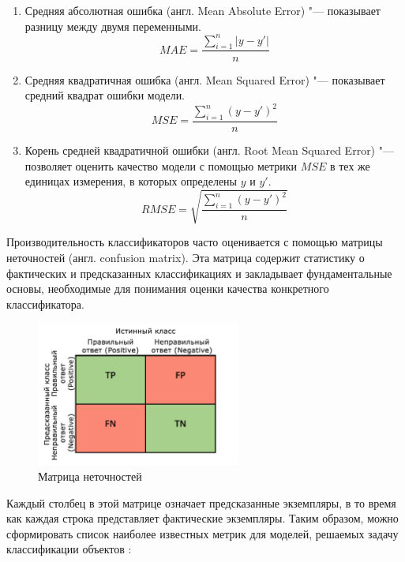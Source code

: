 \documentclass[bachelor, och, coursework]{SCWorks}
\begin{document}
        \begin{enumerate}
            \item
                Средняя абсолютная ошибка (англ. Mean Absolute Error) "---
                показывает разницу между двумя переменными.
                \[MAE = \frac{\sum_{i = 1}^n |y - y'|}{n} \]
            \item
                Средняя квадратичная ошибка (англ. Mean Squared Error) "---
                показывает средний квадрат ошибки модели.
                \[MSE = \frac{\sum_{i = 1}^n (y - y')^2}{n} \]
            \item
                Корень средней квадратичной ошибки (англ. Root Mean Squared
                Error) "--- позволяет оценить качество модели с помощью метрики
                $MSE$ в тех же единицах измерения, в которых определены $y$ и
                $y'$.
                \[RMSE = \sqrt{ \frac{\sum_{i = 1}^n (y - y')^2}{n}} \]
        \end{enumerate}

        Производительность классификаторов часто оценивается с помощью матрицы
        неточностей (англ. confusion matrix). Эта матрица содержит статистику о
        фактических и предсказанных классификациях и закладывает фундаментальные
        основы, необходимые для понимания оценки качества конкретного
        классификатора.
        
        \begin{figure}[H]
            \centering
            \includegraphics[width=0.6\textwidth]{pics/confusion-matrix.png}
            \caption{Матрица неточностей}
        \end{figure}

        Каждый столбец в этой матрице означает предсказанные экземпляры, в то
        время как каждая строка представляет фактические экземпляры. Таким
        образом, можно сформировать список наиболее известных метрик для
        моделей, решаемых задачу классификации объектов \cite{metrics2}:
        
\end{document}
